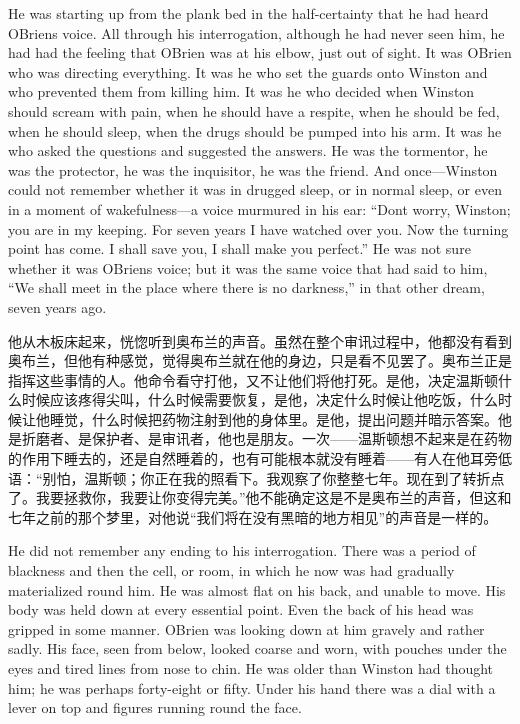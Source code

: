 \begin{paracol}{2}
\switchcolumn*

He was starting up from the plank bed in the half-certainty that he had
heard O\textquotesingle Brien\textquotesingle s voice. All through his
interrogation, although he had never seen him, he had had the feeling
that O\textquotesingle Brien was at his elbow, just out of sight. It was
O\textquotesingle Brien who was directing everything. It was he who set
the guards onto Winston and who prevented them from killing him. It was
he who decided when Winston should scream with pain, when he should have
a respite, when he should be fed, when he should sleep, when the drugs
should be pumped into his arm. It was he who asked the questions and
suggested the answers. He was the tormentor, he was the protector, he
was the inquisitor, he was the friend. And once---Winston could not
remember whether it was in drugged sleep, or in normal sleep, or even in
a moment of wakefulness---a voice murmured in his ear:
``Don\textquotesingle t worry, Winston; you are in my keeping. For seven
years I have watched over you. Now the turning point has come. I shall
save you, I shall make you perfect.'' He was not sure whether it was
O\textquotesingle Brien\textquotesingle s voice; but it was the same
voice that had said to him, ``We shall meet in the place where there is
no darkness,'' in that other dream, seven years ago.

\switchcolumn

他从木板床起来，恍惚听到奥布兰的声音。虽然在整个审讯过程中，他都没有看到奥布兰，但他有种感觉，觉得奥布兰就在他的身边，只是看不见罢了。奥布兰正是指挥这些事情的人。他命令看守打他，又不让他们将他打死。是他，决定温斯顿什么时候应该疼得尖叫，什么时候需要恢复，是他，决定什么时候让他吃饭，什么时候让他睡觉，什么时候把药物注射到他的身体里。是他，提出问题并暗示答案。他是折磨者、是保护者、是审讯者，他也是朋友。一次——温斯顿想不起来是在药物的作用下睡去的，还是自然睡着的，也有可能根本就没有睡着——有人在他耳旁低语：``别怕，温斯顿；你正在我的照看下。我观察了你整整七年。现在到了转折点了。我要拯救你，我要让你变得完美。''他不能确定这是不是奥布兰的声音，但这和七年之前的那个梦里，对他说``我们将在没有黑暗的地方相见''的声音是一样的。

\switchcolumn*

He did not remember any ending to his interrogation. There was a period
of blackness and then the cell, or room, in which he now was had
gradually materialized round him. He was almost flat on his back, and
unable to move. His body was held down at every essential point. Even
the back of his head was gripped in some manner. O\textquotesingle Brien
was looking down at him gravely and rather sadly. His face, seen from
below, looked coarse and worn, with pouches under the eyes and tired
lines from nose to chin. He was older than Winston had thought him; he
was perhaps forty-eight or fifty. Under his hand there was a dial with a
lever on top and figures running round the face.


\end{paracol}
